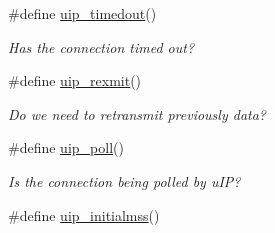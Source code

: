 \begin{CompactItemize}
\#define \hyperlink{a00064_g7b2ac4b18bd2ac3912fe67b3b17158c3}{uip\_\-timedout}()
\begin{CompactList}\small\item\em Has the connection timed out? \item\end{CompactList}\item 
\#define \hyperlink{a00064_ga8933ad15a2e2947dae4a5cff50e6007}{uip\_\-rexmit}()
\begin{CompactList}\small\item\em Do we need to retransmit previously data? \item\end{CompactList}\item 
\#define \hyperlink{a00064_g58bb90796c1cdad3aac2ecf44d87b20e}{uip\_\-poll}()
\begin{CompactList}\small\item\em Is the connection being polled by u\-IP? \item\end{CompactList}\item 
\hypertarget{a00064_ga87feebc7cffd4d8300e776cf64e4fec}{
\#define \hyperlink{a00064_ga87feebc7cffd4d8300e776cf64e4fec}{uip\_\-initialmss}()}
\label{a00064_ga87feebc7cffd4d8300e776cf64e4fec}


\end{CompactItemize}

